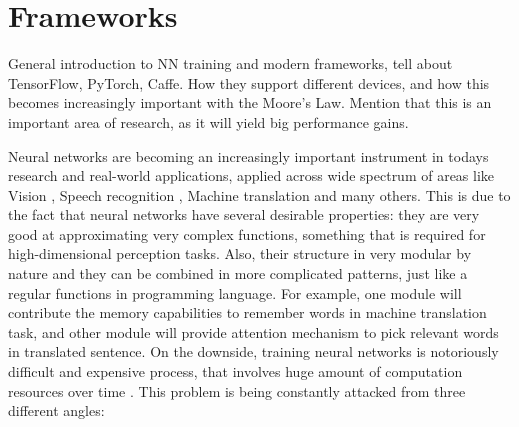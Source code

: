 \section{Frameworks}

General introduction to NN training and modern frameworks, tell about
TensorFlow, PyTorch, Caffe. How they support different devices, and how
this becomes increasingly important with the Moore's Law. Mention that this
is an important area of research, as it will yield big performance gains.

Neural networks are becoming an increasingly important instrument in todays research and
real-world applications, applied across wide spectrum of areas like Vision \cite{ImageNet},
Speech recognition \cite{Baidu}, Machine translation \cite{GoogleNMT} and many others.
This is due to the fact that neural networks have several desirable properties: they are very
good at approximating very complex functions, something that is required for high-dimensional
perception tasks. Also, their structure in very modular by nature and they can be combined in
more complicated patterns, just like a regular functions in programming language. For example,
one module will contribute the memory capabilities to remember words in machine translation
task, and other module will provide attention mechanism to pick relevant words in translated
sentence.
On the downside, training neural networks is notoriously difficult and expensive process,
that involves huge amount of computation resources over time \cite{LongTraining}.
This problem is being constantly attacked from three different angles:
